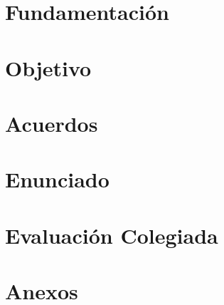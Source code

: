 \documentclass{article}%
\begin{document}
\setlength{\parindent}{1em}



\section{Fundamentación}
	
\section{Objetivo}
	
\section{Acuerdos}
	
\section{Enunciado}
		
\section{Evaluación Colegiada}



\newpage	

\section{Anexos}

	
	
\end{document}
